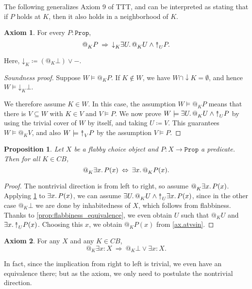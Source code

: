 \documentclass[11pt, oneside, article]{memoir}
\makeatletter
\theoremstyle{plain}
\newtheorem{proposition}[theorem]{Proposition}
\theoremstyle{definition}
\newtheorem{axiom}{Axiom}
\theoremstyle{remark}
\newenvironment{soundproof}{\begin{proof}[Soundness proof]}{\end{proof}}
\newcommand{\const}[1]{\mathtt{#1}}
\newcommand{\Prop}{\const{Prop}}
\newcommand{\BaseSpace}{B}
\newcommand{\AtSymbol}{{@}}
\newcommand{\SeeSymbol}{{\down}}  %
\newcommand{\InSymbol}{{\upclose}}%
\newcommand{\At}[2][]{\AtSymbol^{#1}_{#2}}
\newcommand{\See}[2][]{\SeeSymbol^{#1}_{#2}}
\newcommand{\In}[2][]{\InSymbol^{#1}_{#2}}
\newcommand{\upclose}{{\rotatebox[origin=c]{90}{$\twoheadrightarrow$}}}
\newcommand{\down}{\mathord{\downarrow}}
\newcommand{\imp}{\Rightarrow}
\makeatother
\begin{document}
The following generalizes Axiom 9 of TTT, and can be interpreted as stating that if $P$ holds at $K$, then it also holds in a neighborhood of $K$.

\begin{axiom}\label{ax.at_to_nghbhd}
For every $P : \Prop$,
\[
	\At{K} P \: \imp \: \See{K} \exists U\ldotp \At{K} U \wedge \In{U} P.
\]
\end{axiom}

Here, $\See{K} \coloneqq (\At{K} \bot) \vee -$.

\begin{soundproof}
Suppose $W \models \At{K} P$. If $K\not\in W$, we have $W \cap \downarrow K = \emptyset$, and hence $W \models \See{K} \bot$.

We therefore assume $K\in W$. In this case, the assumption $W \models \At{K} P$ means that there is $V\subseteq W$ with $K\in V$ and $V \models P$. We now prove $W \models \exists U\ldotp \At{K} U \wedge \In{U} P$ by using the trivial cover of $W$ by itself, and taking $U \coloneqq V$. This guarantees $W \models \At{K} V$, and also $W \models \In{V} P$ by the assumption $V \models P$.
\end{soundproof}

\begin{proposition}
Let $X$ be a flabby choice object and $P : X \to \Prop$ a predicate. Then for all $K \in C\BaseSpace$,
\[
	\At{K} \exists x\ldotp P(x) \: \Leftrightarrow \: \exists x\ldotp \At{K} P(x).
\]
\end{proposition}

\begin{proof}
The nontrivial direction is from left to right, so assume $\At{K} \exists x\ldotp P(x)$. Applying \cref{ax.at_to_nghbhd} to $\exists x\ldotp P(x)$, we can assume $\exists U\ldotp \At{K} U \wedge \In{U} \exists x\ldotp P(x)$, since in the other case $\At{K}\bot$ we are done by inhabitedness of $X$, which follows from flabbiness. Thanks to \cref{prop:flabbiness_equivalence}, we even obtain $U$ such that $\At{K} U$ and $\exists x\ldotp \In{U} P(x)$. Choosing this $x$, we obtain $\At{K} P(x)$ from \cref{ax.atvsin}.
\end{proof}

\begin{axiom}
For any $X$ and any $K\in C\BaseSpace$,
\[
	\At{K} \exists x : X \: \Rightarrow \: \At{K} \bot \vee \exists x : X.
\]
\end{axiom}

In fact, since the implication from right to left is trivial, we even have an equivalence there; but as the axiom, we only need to postulate the nontrivial direction.
\end{document}
